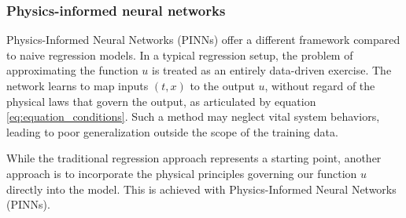 \documentclass{article}
\theoremstyle{definition}
\begin{document}

\subsubsection{Physics-informed neural networks}

Physics-Informed Neural Networks (PINNs) offer a different framework compared to naive regression models. In a typical regression setup, the problem of approximating the function $u$ is treated as an entirely data-driven exercise. The network learns to map inputs $(t, x)$ to the output $u$, without regard of the physical laws that govern the output, as articulated by equation \eqref{eq:equation_conditions}. Such a method may neglect vital system behaviors, leading to poor generalization outside the scope of the training data.

While the traditional regression approach represents a starting point, another approach is to incorporate the physical principles governing our function $u$ directly into the model. This is achieved with Physics-Informed Neural Networks (PINNs).
\end{document}

